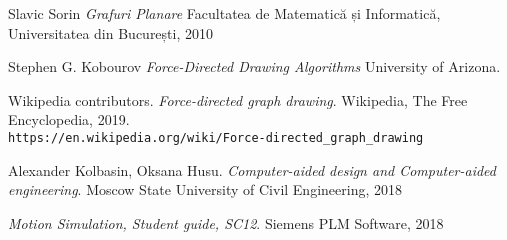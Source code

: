 \begin{thebibliography}{9}
    Slavic Sorin
    \textit{Grafuri Planare}
    Facultatea de Matematică și Informatică, Universitatea din București, 2010

    Stephen G. Kobourov
    \textit{Force-Directed Drawing Algorithms}
    University of Arizona.

    Wikipedia contributors. 
    \textit{Force-directed graph drawing}. 
    Wikipedia, The Free Encyclopedia, 2019.
    \\\texttt{https://en.wikipedia.org/wiki/Force-directed\_graph\_drawing}

    Alexander Kolbasin, Oksana Husu.
    \textit{Computer-aided design and Computer-aided engineering}.
    Moscow State University of Civil Engineering, 2018

    \textit{Motion Simulation, Student guide, SC12}.
    Siemens PLM Software, 2018


\end{thebibliography}